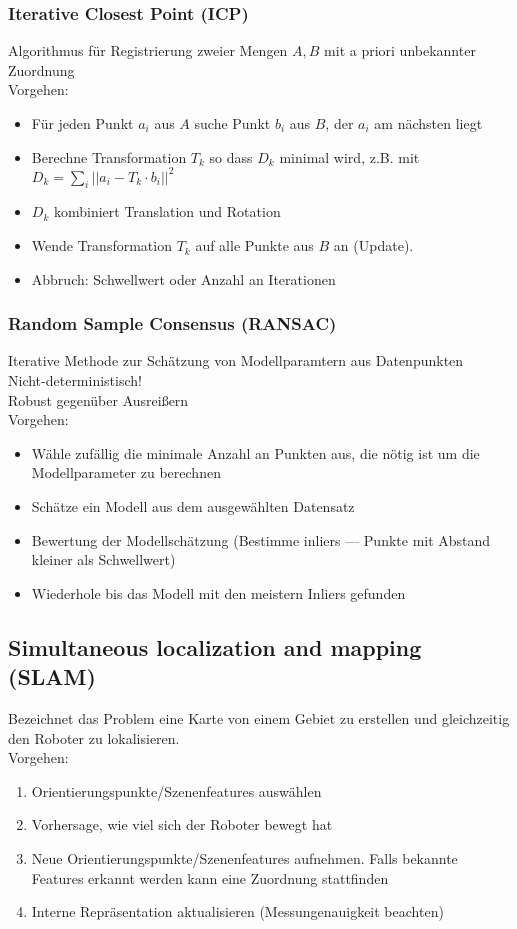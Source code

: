 \subsubsection{Iterative Closest Point (ICP)}
Algorithmus für Registrierung zweier Mengen \(A,B\) mit a priori unbekannter Zuordnung\\
Vorgehen:
\begin{itemize}
\item Für jeden Punkt \(a_i\) aus \(A\) suche Punkt \(b_i\) aus \(B\), der \(a_i\) am nächsten liegt
\item Berechne Transformation \(T_k\) so dass \(D_k\) minimal wird, z.B. mit
  \(D_k = \sum_i || a_i - T_k \cdot b_i ||^2\)
\item \(D_k\) kombiniert Translation und Rotation
\item Wende Transformation \(T_k\) auf alle Punkte aus \(B\) an (Update).
\item Abbruch: Schwellwert oder Anzahl an Iterationen
\end{itemize}

\subsubsection{Random Sample Consensus (RANSAC)}
Iterative Methode zur Schätzung von Modellparamtern aus Datenpunkten\\
Nicht-deterministisch!\\
Robust gegenüber Ausreißern\\
Vorgehen:
\begin{itemize}
\item Wähle zufällig die minimale Anzahl an Punkten aus, die nötig ist um die Modellparameter zu berechnen
\item Schätze ein Modell aus dem ausgewählten Datensatz
\item Bewertung der Modellschätzung (Bestimme inliers --- Punkte mit Abstand kleiner als Schwellwert)
\item Wiederhole bis das Modell mit den meistern Inliers gefunden
\end{itemize}

\subsection{Simultaneous localization and mapping (SLAM)}
Bezeichnet das Problem eine Karte von einem Gebiet zu erstellen und gleichzeitig den Roboter zu lokalisieren.\\
Vorgehen:
\begin{enumerate}
\item Orientierungspunkte/Szenenfeatures auswählen
\item Vorhersage, wie viel sich der Roboter bewegt hat
\item Neue Orientierungspunkte/Szenenfeatures aufnehmen. Falls bekannte Features erkannt werden kann eine Zuordnung stattfinden
\item Interne Repräsentation aktualisieren (Messungenauigkeit beachten)
\end{enumerate}